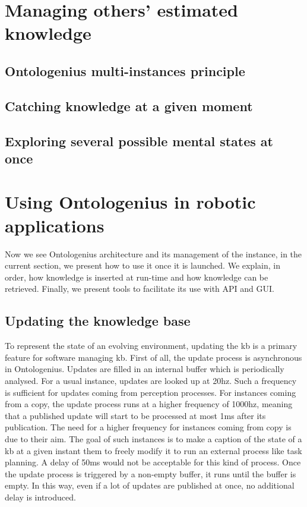 \section{Managing others' estimated knowledge}

\subsection{Ontologenius multi-instances principle}

\subsection{Catching knowledge at a given moment}

\subsection{Exploring several possible mental states at once}



\section{Using Ontologenius in robotic applications}

Now we see Ontologenius architecture and its management of the instance, in the current section, we present how to use it once it is launched. We explain, in order, how knowledge is inserted at run-time and how knowledge can be retrieved. Finally, we present tools to facilitate its use with API and GUI.

\subsection{Updating the knowledge base}

To represent the state of an evolving environment, updating the \acrshort{kb} is a primary feature for software managing \acrshort{kb}. First of all, the update process is asynchronous in Ontologenius. Updates are filled in an internal buffer which is periodically analysed. For a usual instance, updates are looked up at 20hz. Such a frequency is sufficient for updates coming from perception processes. For instances coming from a copy, the update process runs at a higher frequency of 1000hz, meaning that a published update will start to be processed at most 1ms after its publication. The need for a higher frequency for instances coming from copy is due to their aim. The goal of such instances is to make a caption of the state of a \acrshort{kb} at a given instant them to freely modify it to run an external process like task planning. A delay of 50ms would not be acceptable for this kind of process. Once the update process is triggered by a non-empty buffer, it runs until the buffer is empty. In this way, even if a lot of updates are published at once, no additional delay is introduced.

